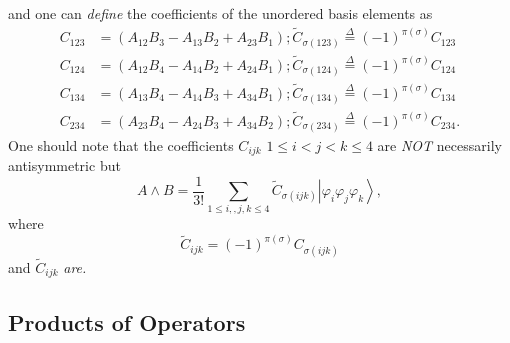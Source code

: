 \documentclass[aps,preprint]{revtex4}%
\begin{document}
and one can \emph{define} the coefficients of the unordered basis elements as
\begin{align}
C_{123} &  =\left(  A_{12}B_{3}-A_{13}B_{2}+A_{23}B_{1}\right)  ;\tilde
{C}_{\sigma\left(  123\right)  }\overset{\Delta}{=}\left(  -1\right)
^{\pi\left(  \sigma\right)  }C_{123}\\
C_{124} &  =\left(  A_{12}B_{4}-A_{14}B_{2}+A_{24}B_{1}\right)  ;\tilde
{C}_{\sigma\left(  124\right)  }\overset{\Delta}{=}\left(  -1\right)
^{\pi\left(  \sigma\right)  }C_{124}\\
C_{134} &  =\left(  A_{13}B_{4}-A_{14}B_{3}+A_{34}B_{1}\right)  ;\tilde
{C}_{\sigma\left(  134\right)  }\overset{\Delta}{=}\left(  -1\right)
^{\pi\left(  \sigma\right)  }C_{134}\\
C_{234} &  =\left(  A_{23}B_{4}-A_{24}B_{3}+A_{34}B_{2}\right)  ;\tilde
{C}_{\sigma\left(  234\right)  }\overset{\Delta}{=}\left(  -1\right)
^{\pi\left(  \sigma\right)  }C_{234}.
\end{align}
One should note that the coefficients $C_{ijk}$ $1\leq i<j<k\leq4$ are
\emph{NOT }necessarily antisymmetric but\emph{ }
\begin{equation}
A\wedge B=\frac{1}{3!}\sum_{1\leq i,,j,k\leq4}\tilde{C}_{\sigma\left(
ijk\right)  }\left\vert \varphi_{i}\varphi_{j}\varphi_{k}\right\rangle ,
\end{equation}
where
\begin{equation}
\tilde{C}_{ijk}=\left(  -1\right)  ^{\pi\left(  \sigma\right)  }%
C_{\sigma\left(  ijk\right)  }%
\end{equation}
and $\tilde{C}_{ijk}$ \emph{are.}

\subsection{Products of Operators}%
\end{document}
